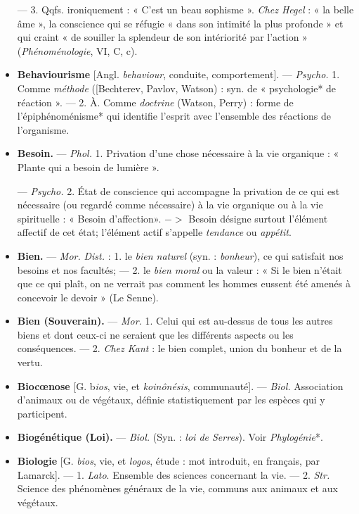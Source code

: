 \begin{itemize}[leftmargin=1cm, label=, itemsep=1pt]
— 3. Qqfs. ironiquement : « C’est
un beau sophisme ». {\it Chez Hegel} :
« la belle âme », la conscience qui se
réfugie « dans son intimité la plus
profonde » et qui craint « de souiller
la splendeur de son intériorité par
l’action » ({\it Phénoménologie}, VI, C, c).

\item {\bf Behaviourisme} [Angl. {\it behaviour}, conduite, comportement]. — \textsf{\textit {Psycho.}}
1. Comme {\it méthode} ([Bechterev,
Pavlov, Watson) : syn. de « psychologie* de réaction ». — 2. À. Comme
{\it doctrine} (Watson, Perry) : forme de
l'épiphénoménisme* qui identifie
l'esprit avec l’ensemble des réactions
de l'organisme.

\item {\bf Besoin.} — \textsf{\textit {Phol.}} 1. Privation d’une
chose nécessaire à la vie organique :
« Plante qui a besoin de lumière ».

— \textsf{\textit {Psycho.}} 2. État de conscience
qui accompagne la privation de ce
qui est nécessaire (ou regardé comme
nécessaire) à la vie organique ou à la
vie spirituelle : « Besoin d'affection».
$->$ Besoin désigne surtout l'élément
affectif de cet état; l’élément actif
s'appelle {\it tendance} ou {\it appétit}.

\item {\bf Bien.} — \textsf{\textit {Mor.}} {\it Dist.} : 1. le {\it bien naturel}
(syn. : {\it bonheur}), ce qui satisfait nos
besoins et nos facultés; — 2. le {\it bien
moral} ou la valeur : « Si le bien
n'était que ce qui plaît, on ne verrait pas comment les hommes eussent
été amenés à concevoir le devoir »
(Le Senne).

\item {\bf Bien (Souverain).} — \textsf{\textit {Mor.}} 1. Celui
qui est au-dessus de tous les autres
biens et dont ceux-ci ne seraient que
les différents aspects ou les conséquences. — 2. {\it Chez Kant} : le bien
complet, union du bonheur et de la
vertu.

\item {\bf Biocœnose} [G. b{\it ios}, vie, et {\it koinônésis},
communauté]. — \textsf{\textit {Biol.}} Association
d'animaux ou de végétaux, définie
statistiquement par les espèces qui y
participent.

\item {\bf Biogénétique (Loi).} — \textsf{\textit {Biol.}} (Syn. :
{\it loi de Serres}). Voir {\it Phylogénie}*.

\item {\bf Biologie} [G. {\it bios}, vie, et {\it logos}, étude :
mot introduit, en français, par
Lamarck]. — 1. {\it Lato}. Ensemble des
sciences concernant la vie. — 2. {\it Str.}
Science des phénomènes généraux
de la vie, communs aux animaux et
aux végétaux.


\end{itemize}
